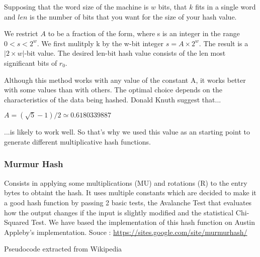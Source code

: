 \documentclass[12pt]{article}
\begin{document}
\vspace{0.7cm}
Supposing that the word size of the machine is $w$ bits, that $k$ fits in a single word and $len$ is the number of bits that you want for the size of your hash value.

 We restrict $A$ to be a fraction of the form, where s is an integer in the range $0<s<2^w$. We first mulitply k by the w-bit integer $s = A\times 2^w$. The result is a $|2 \times w| $-bit value. The desired len-bit hash value consists of the len most significant bits of $r_0$. 


Although this method works with any value of the constant A, it works better with some values than with others. The optimal choice depends on the characteristics of the data being hashed. Donald Knuth suggest that...

$ A = (\sqrt{5} -1)/2 \simeq 0.6180339887  $

...is likely to work well. So that's why we used this value as an starting point to generate different multiplicative hash functions.


\subsubsection{Murmur Hash}

Consists in applying some multiplications (MU) and rotations (R) to the entry bytes to obtaint the hash. It uses multiple constants which are decided to make it a good hash function by passing 2 basic tests, the Avalanche Test that evaluates how the output changes if the input is slightly modified and the statistical Chi-Squared Test. We have based the implementation of this hash function on Austin Appleby's implementation. Souce : \url{https://sites.google.com/site/murmurhash/}\\
\medskip
\begin{center}
\begin{large}
Pseudocode extracted from Wikipedia
\end{large}
\end{center}
\end{document}
